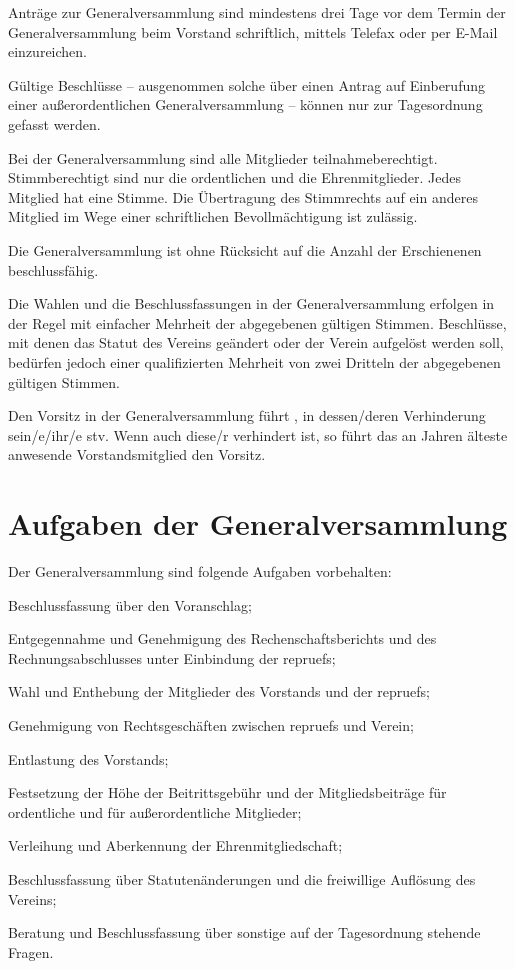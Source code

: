 \documentclass{article}
\begin{document}
\begin{absatz}
    \item Anträge zur Generalversammlung sind mindestens drei Tage vor dem Termin der Generalversammlung beim Vorstand schriftlich, mittels Telefax oder per E-Mail einzureichen.
    \item Gültige Beschlüsse – ausgenommen solche über einen Antrag auf Einberufung einer außerordentlichen Generalversammlung – können nur zur Tagesordnung gefasst werden.
    \item Bei der Generalversammlung sind alle Mitglieder teilnahmeberechtigt. Stimmberechtigt sind nur die ordentlichen und die Ehrenmitglieder. Jedes Mitglied hat eine Stimme. Die Übertragung des Stimmrechts auf ein anderes Mitglied im Wege einer schriftlichen Bevollmächtigung ist zulässig.
    \item Die Generalversammlung ist ohne Rücksicht auf die Anzahl der Erschienenen beschlussfähig.
    \item Die Wahlen und die Beschlussfassungen in der Generalversammlung erfolgen in der Regel mit einfacher Mehrheit der abgegebenen gültigen Stimmen. Beschlüsse, mit denen das Statut des Vereins geändert oder der Verein aufgelöst werden soll, bedürfen jedoch einer qualifizierten Mehrheit von zwei Dritteln der abgegebenen gültigen Stimmen.
    \item Den Vorsitz in der Generalversammlung führt , in dessen/deren Verhinderung sein/e/ihr/e \gls{stv}. Wenn auch diese/r verhindert ist, so führt das an Jahren älteste anwesende Vorstandsmitglied den Vorsitz.
\end{absatz}



\section{Aufgaben der Generalversammlung}\label{generalversammlung-aufgaben}
Der Generalversammlung sind folgende Aufgaben vorbehalten:
\begin{littera}
    \item Beschlussfassung über den Voranschlag;
    \item Entgegennahme und Genehmigung des Rechenschaftsberichts und des Rechnungsabschlusses unter Einbindung der \glspl{repruef};
    \item Wahl und Enthebung der Mitglieder des Vorstands und der \glspl{repruef};
    \item Genehmigung von Rechtsgeschäften zwischen \glspl{repruef} und Verein;
    \item Entlastung des Vorstands;
    \item Festsetzung der Höhe der Beitrittsgebühr und der Mitgliedsbeiträge für ordentliche und für außerordentliche Mitglieder;
    \item Verleihung und Aberkennung der Ehrenmitgliedschaft;
    \item Beschlussfassung über Statutenänderungen und die freiwillige Auflösung des Vereins;
    \item Beratung und Beschlussfassung über sonstige auf der Tagesordnung stehende Fragen.
\end{littera}
\end{document}
